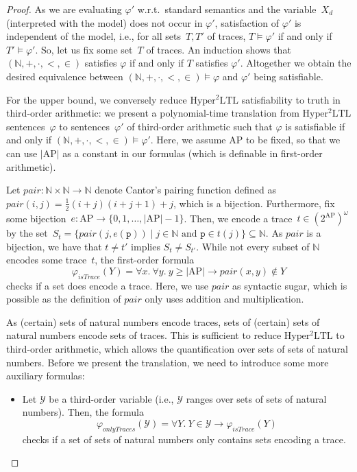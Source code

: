 \documentclass[dvipsnames,10pt,a4paper]{amsart}
\theoremstyle{definition}
\theoremstyle{remark}
\newcommand{\nats}{\mathbb{N}}
\renewcommand{\phi}{\varphi}
\newcommand{\size}[1]{|#1|}
\newcommand{\pow}[1]{2^{#1}}
\newcommand{\set}[1]{\{#1\}}
\newcommand{\sohyltl}{\mathrm{Hyper^2LTL}\xspace}
\newcommand{\ap}[0]{\mathrm{AP}}
\newcommand{\unidisvar}{X_d}
\newcommand{\proposition}{\texttt{p}}
\newcommand{\pair}{\mathit{pair}}
\newcommand{\istrace}{\mathit{isTrace}}
\newcommand{\onlytraces}{\mathit{onlyTraces}}
\newcommand{\calY}{\mathcal{Y}}
\newcommand{\natsstruct}{(\nats, +, \cdot, <, \in)}
\begin{document}
\begin{proof}
As we are evaluating $\phi'$ w.r.t.\ standard semantics and the variable~$\unidisvar$ (interpreted with the model) does not occur in $\phi'$, satisfaction of $\varphi'$ is independent of the model, i.e., for all sets~$T,T'$ of traces, $T \models \varphi'$ if and only if $T' \models \varphi'$.
So, let us fix some set~$T$ of traces.
An induction shows that $\natsstruct$ satisfies $\phi$ if and only if $T$ satisfies $\phi'$.
Altogether we obtain the desired equivalence between $\natsstruct \models \phi$ and $\phi'$ being satisfiable.

For the upper bound, we conversely reduce $\sohyltl$ satisfiability to truth in third-order arithmetic: we present a polynomial-time translation from $\sohyltl$ sentences~$\phi$ 
 to sentences~$\phi'$ of third-order arithmetic such that  $\phi$ is satisfiable if and only if  $\natsstruct \models \phi'$. Here, we assume $\ap$ to be fixed, so that we can use $\size{\ap}$ as a constant in our formulas (which is definable in first-order arithmetic). 

Let $\pair \colon \nats\times\nats \rightarrow\nats$ denote Cantor's pairing function defined as $\pair(i,j) = \frac{1}{2}(i+j)(i+j+1) +j$, which is a bijection.
Furthermore, fix some bijection~$e \colon \ap \rightarrow\set{0,1,\ldots,\size{\ap}-1}$.
Then, we encode a trace~$t \in (\pow{\ap})^\omega$ by the set~$S_t =\set{\pair(j,e(\proposition)) \mid j \in \nats \text{ and } \proposition \in t(j)} \subseteq \nats$.
As $\pair$ is a bijection, we have that $t \neq t'$ implies $S_t \neq S_{t'}$.
While not every subset of $\nats$ encodes some trace~$t$, the first-order formula 
\[\phi_\istrace(Y) = \forall x.\ \forall y.\ y \ge \size{\ap} \rightarrow \pair(x,y) \notin Y \] checks if a set does encode a trace.
Here, we use $\pair$ as syntactic sugar, which is possible as the definition of $\pair$ only uses addition and multiplication.

As (certain) sets of natural numbers encode traces, sets of (certain) sets of natural numbers encode sets of traces. 
This is sufficient to reduce $\sohyltl$ to third-order arithmetic, which allows the quantification over sets of sets of natural numbers. 
Before we present the translation, we need to introduce some more auxiliary formulas:
\begin{itemize}
    \item Let $\calY$ be a third-order variable (i.e., $\calY$ ranges over sets of sets of natural numbers). Then, the formula
    \[\phi_\onlytraces(\calY) = \forall Y.\  Y  \in \calY \rightarrow \phi_\istrace(Y) \]
    checks if a set of sets of natural numbers only contains sets encoding a trace.


\end{itemize}
\end{proof}
\end{document}
